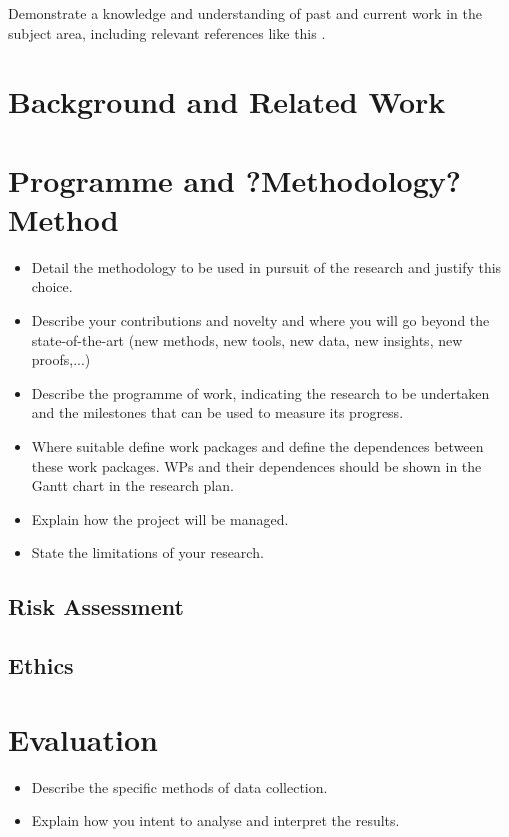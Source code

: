 Demonstrate a knowledge and understanding of past and current work in
the subject area, including relevant references like this
\citep{template}.

\section{Background and Related Work}\label{background-and-related-work}

\section{Programme and ?Methodology?
Method}\label{programme-and-methodology-method}

\begin{itemize}
\item
  Detail the methodology to be used in pursuit of the research and
  justify this choice.
\item
  Describe your contributions and novelty and where you will go beyond
  the state-of-the-art (new methods, new tools, new data, new insights,
  new proofs,...)
\item
  Describe the programme of work, indicating the research to be
  undertaken and the milestones that can be used to measure its
  progress.
\item
  Where suitable define work packages and define the dependences between
  these work packages. WPs and their dependences should be shown in the
  Gantt chart in the research plan.
\item
  Explain how the project will be managed.
\item
  State the limitations of your research.
\end{itemize}

\subsection{Risk Assessment}\label{risk-assessment}

\subsection{Ethics}\label{ethics}

\section{Evaluation}\label{evaluation}

\begin{itemize}
\item
  Describe the specific methods of data collection.
\item
  Explain how you intent to analyse and interpret the results.
\end{itemize}

